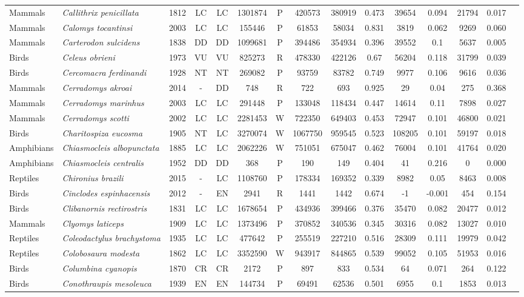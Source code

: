 \documentclass[12pt,openright,oneside,a4paper,english]{abntex2}
\begin{document}
\begin{landscape}
\begin{longtable}{llccccccccccccc}
		Mammals&\textit{Callithrix penicillata}&1812&LC&LC&1301874&P&420573&380919&0.473&39654&0.094&21794&0.017\\
		Mammals&\textit{Calomys tocantinsi}&2003&LC&LC&155446&P&61853&58034&0.831&3819&0.062&9269&0.060\\
		Mammals&\textit{Carterodon sulcidens}&1838&DD&DD&1099681&P&394486&354934&0.396&39552&0.1&5637&0.005\\
		Birds&\textit{Celeus obrieni}&1973&VU&VU&825273&R&478330&422126&0.67&56204&0.118&31799&0.039\\
		Birds&\textit{Cercomacra ferdinandi}&1928&NT&NT&269082&P&93759&83782&0.749&9977&0.106&9616&0.036\\
		Mammals&\textit{Cerradomys akroai}&2014&-&DD&748&R&722&693&0.925&29&0.04&275&0.368\\
		Mammals&\textit{Cerradomys marinhus}&2003&LC&LC&291448&P&133048&118434&0.447&14614&0.11&7898&0.027\\
		Mammals&\textit{Cerradomys scotti}&2002&LC&LC&2281453&W&722350&649403&0.453&72947&0.101&46800&0.021\\
		Birds&\textit{Charitospiza eucosma}&1905&NT&LC&3270074&W&1067750&959545&0.523&108205&0.101&59197&0.018\\
		Amphibians&\textit{Chiasmocleis albopunctata}&1885&LC&LC&2062226&W&751051&675047&0.462&76004&0.101&41764&0.020\\
		Amphibians&\textit{Chiasmocleis centralis}&1952&DD&DD&368&P&190&149&0.404&41&0.216&0&0.000\\
		Reptiles&\textit{Chironius brazili}&2015&-&LC&1108760&P&178334&169352&0.339&8982&0.05&8463&0.008\\
		Birds&\textit{Cinclodes espinhacensis}&2012&-&EN&2941&R&1441&1442&0.674&-1&-0.001&454&0.154\\
		Birds&\textit{Clibanornis rectirostris}&1831&LC&LC&1678654&P&434936&399466&0.376&35470&0.082&20477&0.012\\
		Mammals&\textit{Clyomys laticeps}&1909&LC&LC&1373496&P&370852&340536&0.345&30316&0.082&13027&0.010\\
		Reptiles&\textit{Coleodactylus brachystoma}&1935&LC&LC&477642&P&255519&227210&0.516&28309&0.111&19979&0.042\\
		Reptiles&\textit{Colobosaura modesta}&1862&LC&LC&3352590&W&943917&844865&0.539&99052&0.105&51953&0.016\\
		Birds&\textit{Columbina cyanopis}&1870&CR&CR&2172&P&897&833&0.534&64&0.071&264&0.122\\
		Birds&\textit{Conothraupis mesoleuca}&1939&EN&EN&144734&P&69491&62536&0.501&6955&0.1&1853&0.013\\

\end{longtable}
\end{landscape}
\end{document}
